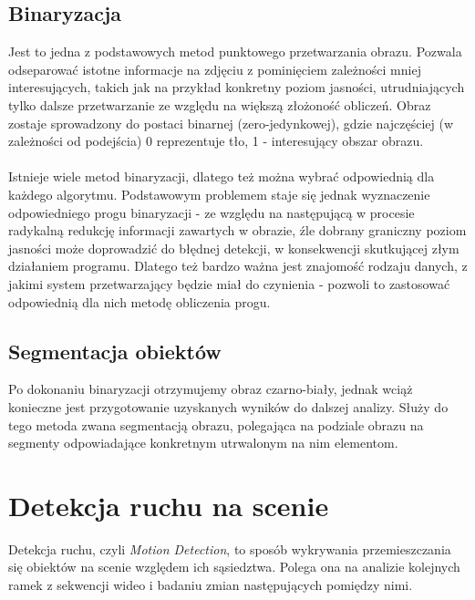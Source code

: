 \subsection{Binaryzacja}
Jest to jedna z podstawowych metod punktowego przetwarzania obrazu.  Pozwala odseparować istotne informacje na zdjęciu z pominięciem zależności mniej interesujących, takich jak na przykład konkretny poziom jasności, utrudniających tylko dalsze przetwarzanie ze względu na większą złożoność obliczeń. Obraz zostaje sprowadzony do postaci binarnej (zero-jedynkowej), gdzie najczęściej (w zależności od podejścia) 0 reprezentuje tło, 1 - interesujący obszar obrazu.  
\paragraph{}
Istnieje wiele metod binaryzacji, dlatego też można wybrać odpowiednią dla każdego algorytmu. Podstawowym problemem staje się jednak wyznaczenie odpowiedniego progu binaryzacji - ze względu na następującą w procesie radykalną redukcję informacji zawartych w obrazie, źle dobrany graniczny poziom jasności może doprowadzić do błędnej detekcji, w konsekwencji skutkującej złym działaniem programu. Dlatego też bardzo ważna jest znajomość rodzaju danych, z jakimi system przetwarzający będzie miał do czynienia - pozwoli to zastosować odpowiednią dla nich metodę obliczenia progu.
\subsection{Segmentacja obiektów}
Po dokonaniu binaryzacji otrzymujemy obraz czarno-biały, jednak wciąż konieczne jest przygotowanie uzyskanych wyników do dalszej analizy. Służy do tego metoda zwana segmentacją obrazu, polegająca na podziale obrazu na segmenty odpowiadające konkretnym utrwalonym na nim elementom.
\section{Detekcja ruchu na scenie}
Detekcja ruchu, czyli \textit{Motion Detection}, to sposób wykrywania przemieszczania się obiektów na scenie względem ich sąsiedztwa. Polega ona na analizie kolejnych ramek z sekwencji wideo i badaniu zmian następujących pomiędzy nimi.

